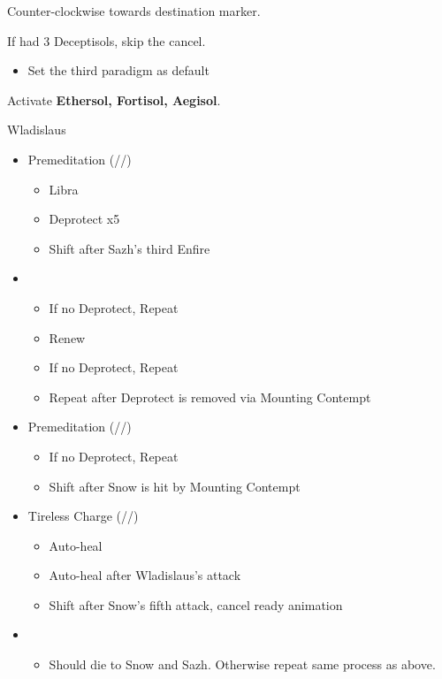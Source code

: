 Counter-clockwise towards destination marker.

 If had 3 Deceptisols, skip the cancel.

\begin{menu}
\begin{itemize}
    \paradigm
    \begin{itemize}
        \item Set the third paradigm as default
    \end{itemize}
\end{itemize}
\end{menu}

Activate \textbf{Ethersol, Fortisol, Aegisol}.

\renewcommand{\third}{[3] Premeditation (\sab/\sen/\syn)}
\renewcommand{\first}{[1] Tireless Charge (\med/\com/\com)}

\begin{battle}{Wladislaus}
\begin{itemize}
    \item \third
    \begin{itemize}
        \item Libra
        \item Deprotect x5
        \item Shift after Sazh's third Enfire
    \end{itemize}
    \item \second
    \begin{itemize}
        \item If no Deprotect, Repeat
        \item Renew
        \item If no Deprotect, Repeat
        \item Repeat after Deprotect is removed via Mounting Contempt
    \end{itemize}
    \item \third
    \begin{itemize}
        \item If no Deprotect, Repeat
        \item Shift after Snow is hit by Mounting Contempt
    \end{itemize}
    \item \first
    \begin{itemize}
        \item Auto-heal
        \item Auto-heal after Wladislaus's attack
        \item Shift after Snow's fifth attack, cancel ready animation
    \end{itemize}
    \item \second
    \begin{itemize}
        \item Should die to Snow and Sazh. Otherwise repeat same process as above.
    \end{itemize}
\end{itemize}
\end{battle}

